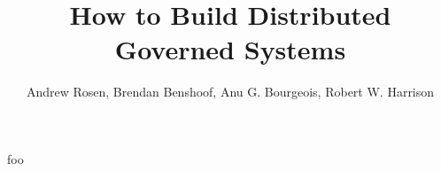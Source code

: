 \documentclass[11pt,letterpaper]{article}
\author{Andrew Rosen, Brendan Benshoof, Anu G. Bourgeois, Robert W. Harrison}
\date{}
\title{How to Build Distributed Governed Systems}
\begin{document}
	\maketitle
	
	
	\cite{nomic}
	\cite{camilleri2010playing}
	
	foo \cite{tezos}
	
	
\end{document}

